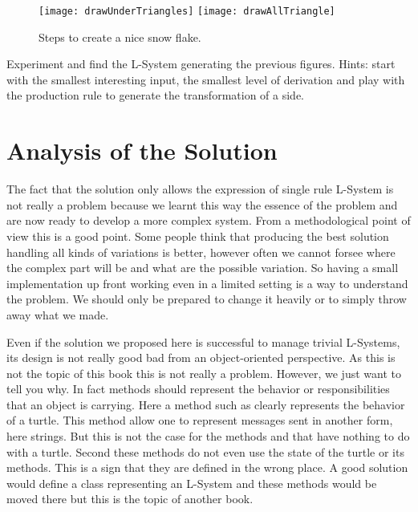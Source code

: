 \begin{figure}
\texttt{[image: drawUnderTriangles]}
\texttt{[image: drawAllTriangle]}
\caption{Steps to create a nice snow flake. \label{fig:snow}}
\end{figure}
\begin{exonofig}
Experiment and find the L-System generating the previous figures.
Hints: start with the smallest interesting input, the smallest level
of derivation and play with the production rule to generate the
transformation of a side.
\end{exonofig}



\section{Analysis of the Solution}
The fact that the solution only allows the expression of single rule
L-System is not really a problem because we learnt this way the
essence of the problem and are now ready to develop a more complex
system.  From a methodological point of view this is a good
point. Some people think that producing the best solution handling all
kinds of variations is better, however often we cannot forsee
where the complex part will be and what are the possible variation. So having a small implementation up front working even in a limited setting is a way to understand the
problem. We should only be prepared to change it heavily or to simply
throw away what we made.


Even if the solution we proposed here is successful to manage trivial
L-Systems, its design is not really good bad from an object-oriented perspective. As this is not the topic of this book this is not really a problem. However, we just want to tell you why.
In fact methods should represent the behavior or responsibilities that an object is carrying. Here a method such as
 clearly represents the behavior of a turtle. This method allow one to represent messages sent in another form, here strings.  But this is  not the case for the methods  and  
that have nothing to do with a turtle. Second
these methods do not even use the state of the turtle or its
methods. This is a sign that they are defined in the wrong place. A good solution would define  a class representing an L-System and these methods would be moved there but this is the topic of another book. 


\ifx\wholebook\relax\else\fi
